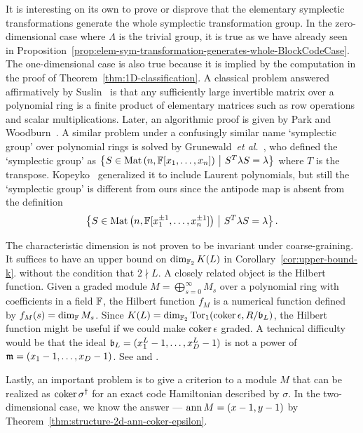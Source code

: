 It is interesting on its own to prove or disprove
that the elementary symplectic transformations 
generate the whole symplectic transformation group.
In the zero-dimensional case where $\Lambda$ is the trivial group,
it is true as we have already seen in 
Proposition~\ref{prop:elem-sym-transformation-generates-whole-BlockCodeCase}.
The one-dimensional case is also true 
because it is implied by the computation in the proof of Theorem~\ref{thm:1D-classification}.
A classical problem answered affirmatively by Suslin~\cite{Suslin1977Stability}
is that any sufficiently large invertible matrix over a polynomial ring
is a finite product of elementary matrices such as row operations and scalar multiplications.
Later, an algorithmic proof is given by Park and Woodburn~\cite{ParkWoodburn1995Algorithmic}.
A similar problem under a confusingly similar name `symplectic group' over polynomial rings
is solved by Grunewald~{\em et al.}~\cite{GrunewaldMennickeVaserstein1991SymplecticGroup},
who defined the `symplectic group' as
$ \left\{ S \in \mathrm{Mat}\left(n, \mathbb{F}[x_1,\ldots,x_n]\right) ~\middle| ~ S^T \lambda S = \lambda \right\}$
where $T$ is the transpose.
Kopeyko~\cite{Kopeyko1999Symplectic} generalized it to include Laurent polynomials,
but still the `symplectic group' is different from ours
since the antipode map is absent from the definition
\[
 \left\{ S \in \mathrm{Mat}\left(n, \mathbb{F}[x_1^{\pm 1},\ldots,x_n^{\pm 1}]\right) ~\middle| ~ S^T \lambda S = \lambda \right\} .
\]

The characteristic dimension is not proven to be invariant under coarse-graining.
It suffices to have an upper bound on $\dim_{\mathbb{F}_2} K(L)$ in Corollary~\ref{cor:upper-bound-k}.
without the condition that $2 \nmid L$.
A closely related object is the Hilbert function.
Given a graded module $M = \bigoplus_{s=0}^{\infty} M_s$ 
over a polynomial ring with coefficients in a field $\mathbb{F}$,
the Hilbert function $f_M$ is a numerical function defined by $f_M(s) = \dim_{\mathbb{F}} M_s$.
Since $K(L) = \dim_{\mathbb{F}_2} \mathop{\mathrm{Tor}}\nolimits_1(\mathop{\mathrm{coker}}\nolimits \epsilon, R / \mathfrak{b}_L)$,
the Hilbert function might be useful if we could make $\mathop{\mathrm{coker}}\nolimits \epsilon$ graded.
A technical difficulty would be that the ideal $\mathfrak{b}_L=(x_1^L-1,\ldots,x_D^L-1)$ 
is not a power of $\mathfrak{m}=(x_1 - 1,\ldots,x_D-1)$.
See \cite[Chapter~12]{Eisenbud} and \cite{IyengarPuthenpurakal2007HilbertSamuelFunctions}.

Lastly, an important problem is to give a criterion to a module $M$
that can be realized as $\mathop{\mathrm{coker}}\nolimits \sigma^\dagger$
for an exact code Hamiltonian described by $\sigma$.
In the two-dimensional case, we know the answer ---
$\mathop{\mathrm{ann}}\nolimits M = (x-1,y-1)$ by Theorem~\ref{thm:structure-2d-ann-coker-epsilon}.
